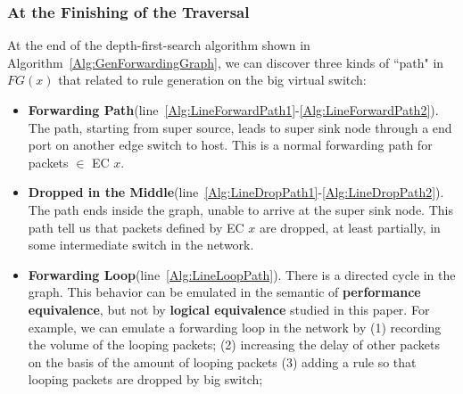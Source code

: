 \subsubsection{At the Finishing of the Traversal}
At the end of the depth-first-search algorithm shown in
Algorithm~\ref{Alg:GenForwardingGraph}, we can discover three kinds of
``path" in $FG(x)$ that related to rule generation on the big virtual switch:
\begin{itemize}
\item \textbf{Forwarding Path}(line~\ref{Alg:LineForwardPath1}-\ref{Alg:LineForwardPath2}).
        The path, starting from super source,
        leads to super sink node through a end port on another edge switch to host.
        This is a normal forwarding path for packets $\in$ EC $x$.
\item \textbf{Dropped in the Middle}(line~\ref{Alg:LineDropPath1}-\ref{Alg:LineDropPath2}).
        The path ends inside the graph, unable to arrive
        at the super sink node. This path tell us that packets
        defined by EC $x$ are dropped, at least partially,
        in some intermediate switch in the network.
\item \textbf{Forwarding Loop}(line~\ref{Alg:LineLoopPath}).
        There is a directed cycle in the graph.
        This behavior can be emulated in the semantic of \textbf{performance equivalence},
        but not by \textbf{logical equivalence} studied in this paper.        
        For example, we can emulate a forwarding loop in the network by
        (1) recording the volume of the looping packets;
        (2) increasing the delay of other packets on the basis of the amount of looping packets
        (3) adding a rule so that looping packets are dropped by big switch;
\end{itemize}

